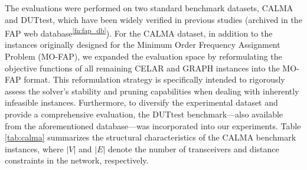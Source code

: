 \documentclass[letterpaper,journal]{IEEEtran}
\begin{document}
The evaluations were performed on two standard benchmark datasets, CALMA and DUTtest, which have been widely verified in previous studies (archived in the FAP web database\textsuperscript{\ref{fn:fap_db}}). For the CALMA dataset, in addition to the instances originally designed for the Minimum Order Frequency Assignment Problem (MO-FAP), we expanded the evaluation space by reformulating the objective functions of all remaining CELAR and GRAPH instances into the MO-FAP format. This reformulation strategy is specifically intended to rigorously assess the solver's stability and pruning capabilities when dealing with inherently infeasible instances. Furthermore, to diversify the experimental dataset and provide a comprehensive evaluation, the DUTtest benchmark—also available from the aforementioned database—was incorporated into our experiments. Table \ref{tab:calma} summarizes the structural characteristics of the CALMA benchmark instances, where $|V|$ and $|E|$ denote the number of transceivers and distance constraints in the network, respectively.

\end{document}
